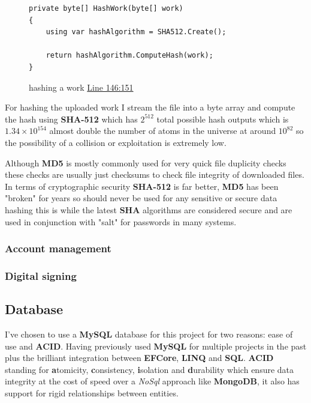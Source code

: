 \begin{figure}[H]
\caption{hashing a work \href{https://github.com/MrHarrisonBarker/CRPL/blob/main/CRPL.Web/Services/WorksVerificationService.cs}{Line 146:151}}
\centering
\begin{lstlisting}[language=CSharp]
private byte[] HashWork(byte[] work)
{
	using var hashAlgorithm = SHA512.Create();

	return hashAlgorithm.ComputeHash(work);
}
\end{lstlisting}
\end{figure}

For hashing the uploaded work I stream the file into a byte array and compute the hash using \textbf{SHA-512} which has \(2^{512}\) total possible hash outputs which is \(1.34 \times 10^{154}\) almost double the number of atoms in the universe at around \(10^{82}\) so the possibility of a collision or exploitation is extremely low. 

Although \textbf{MD5} is mostly commonly used for very quick file duplicity checks these checks are usually just checksums to check file integrity of downloaded files. In terms of cryptographic security \textbf{SHA-512} is far better, \textbf{MD5} has been "broken" for years so should never be used for any sensitive or secure data hashing this is while the latest \textbf{SHA} algorithms are considered secure and are used in conjunction with "salt" for passwords in many systems.

\subsubsection{Account management}
\subsubsection{Digital signing}

\subsection{Database}

I've chosen to use a \textbf{MySQL} database for this project for two reasons: ease of use and \textbf{ACID}. Having previously used \textbf{MySQL} for multiple projects in the past plus the brilliant integration between \textbf{EFCore}, \textbf{LINQ} and \textbf{SQL}. \textbf{ACID} standing for \textbf{a}tomicity, \textbf{c}onsistency, \textbf{i}solation and \textbf{d}urability which ensure data integrity at the cost of speed over a \textit{NoSql} approach like \textbf{MongoDB}, it also has support for rigid relationships between entities.

